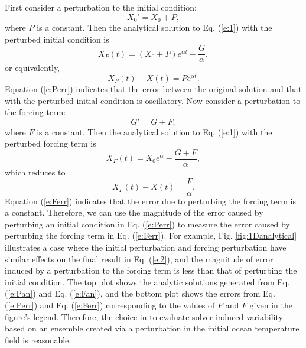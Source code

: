 \documentclass[gmd, manuscript]{copernicus}
\begin{document}
First consider a perturbation to the initial condition:
\begin{equation*}
X_0' =X_0+P,
\end{equation*}
where $P$ is a constant.  Then the analytical solution to Eq. (\ref{e:1}) with the perturbed initial condition is
\begin{equation}
X_P(t) = (X_0+P)e^{\alpha t } -\frac{G}{\alpha}, 
\label{e:Pan}
\end{equation}
or equivalently, 
\begin{equation}
X_P(t)-X(t) = Pe^{\alpha t }.
\label{e:Perr}
\end{equation}
Equation (\ref{e:Perr}) indicates that the error between the original solution and that with the perturbed initial condition  is oscillatory.
Now consider a perturbation to the forcing term:
\begin{equation*}
G' = G + F,
\end{equation*}
where $F$ is a constant.  Then the analytical solution to Eq. (\ref{e:1}) with the perturbed forcing term is
\begin{equation}
X_F(t) = X_0e^{\alpha } -\frac{G+F}{\alpha},
\label{e:Fan}
\end{equation}
which reduces to
\begin{equation}
X_F(t)-X(t) = \frac{F}{\alpha}. 
\label{e:Ferr}
\end{equation}
Equation (\ref{e:Ferr}) indicates that the error due to perturbing the forcing term is a constant. Therefore, we can use the magnitude of the error caused by perturbing an initial condition in Eq. (\ref{e:Perr}) to measure the error caused by perturbing the forcing term in Eq. (\ref{e:Ferr}).  For example, Fig. \ref{fig:1Danalytical} illustrates a case where the initial perturbation and forcing perturbation have similar effects on the final result in Eq. (\ref{e:2}), and the magnitude of error induced by a perturbation to the forcing term is less than that of perturbing the initial condition.  The top plot shows the analytic solutions generated from Eq. (\ref{e:Pan}) and Eq. (\ref{e:Fan}), and the bottom plot shows the errors from Eq. (\ref{e:Perr}) and Eq. (\ref{e:Ferr}) corresponding to the values of $P$ and $F$ given in the figure's legend.
Therefore, the choice in \cite{yong2015} to evaluate solver-induced variability based on an ensemble created via a perturbation in the initial ocean temperature field is reasonable.
\end{document}
